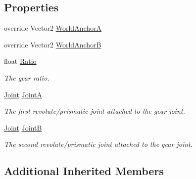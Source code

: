 \subsection*{Properties}
\begin{DoxyCompactItemize}
\item 
override Vector2 \hyperlink{class_farseer_physics_1_1_dynamics_1_1_joints_1_1_gear_joint_a21997d36203f1c04571c160fdaa82912}{World\+Anchor\+A}
\item 
override Vector2 \hyperlink{class_farseer_physics_1_1_dynamics_1_1_joints_1_1_gear_joint_a13b1330229a1749cc4f90f391d6f6c6f}{World\+Anchor\+B}
\item 
float \hyperlink{class_farseer_physics_1_1_dynamics_1_1_joints_1_1_gear_joint_a42f723255b91a5aed105f55ad688e59a}{Ratio}
\begin{DoxyCompactList}\small\item\em The gear ratio. \end{DoxyCompactList}\item 
\hyperlink{class_farseer_physics_1_1_dynamics_1_1_joints_1_1_joint}{Joint} \hyperlink{class_farseer_physics_1_1_dynamics_1_1_joints_1_1_gear_joint_a5b378a26f47bed9789329263178fbe40}{Joint\+A}
\begin{DoxyCompactList}\small\item\em The first revolute/prismatic joint attached to the gear joint. \end{DoxyCompactList}\item 
\hyperlink{class_farseer_physics_1_1_dynamics_1_1_joints_1_1_joint}{Joint} \hyperlink{class_farseer_physics_1_1_dynamics_1_1_joints_1_1_gear_joint_aab93ee869773d8b4ad51d4e121b8ad83}{Joint\+B}
\begin{DoxyCompactList}\small\item\em The second revolute/prismatic joint attached to the gear joint. \end{DoxyCompactList}\end{DoxyCompactItemize}
\subsection*{Additional Inherited Members}


